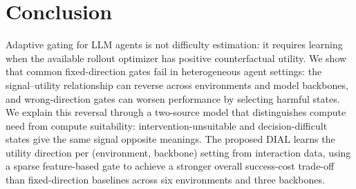 
\section{Conclusion}

Adaptive gating for LLM agents is not difficulty estimation: it requires learning when the available rollout optimizer has positive counterfactual utility. We show that common fixed-direction gates fail in heterogeneous agent settings: the signal--utility relationship can reverse across environments and model backbones, and wrong-direction gates can worsen performance by selecting harmful states. We explain this reversal through a two-source model that distinguishes compute need from compute suitability: intervention-unsuitable and decision-difficult states give the same signal opposite meanings. The proposed DIAL learns the utility direction per (environment, backbone) setting from interaction data, using a sparse feature-based gate to achieve a stronger overall success-cost trade-off than fixed-direction baselines across six environments and three backbones.
